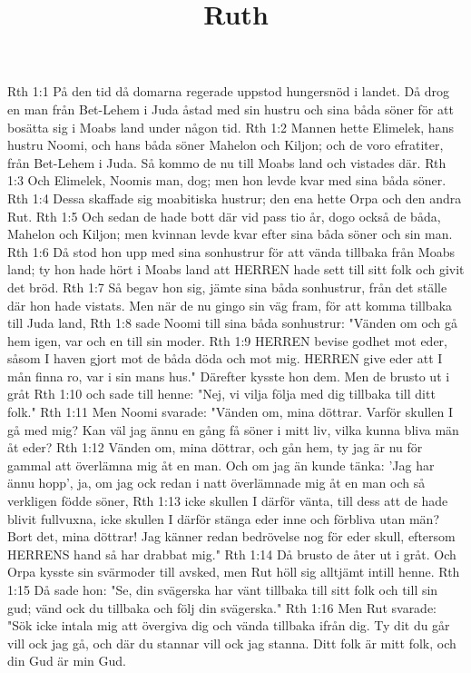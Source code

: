

\title{Ruth}

Rth 1:1  På den tid då domarna regerade uppstod hungersnöd i landet. Då drog en man från Bet-Lehem i Juda åstad med sin hustru och sina båda söner för att bosätta sig i Moabs land under någon tid.
Rth 1:2  Mannen hette Elimelek, hans hustru Noomi, och hans båda söner Mahelon och Kiljon; och de voro efratiter, från Bet-Lehem i Juda. Så kommo de nu till Moabs land och vistades där.
Rth 1:3  Och Elimelek, Noomis man, dog; men hon levde kvar med sina båda söner.
Rth 1:4  Dessa skaffade sig moabitiska hustrur; den ena hette Orpa och den andra Rut.
Rth 1:5  Och sedan de hade bott där vid pass tio år, dogo också de båda, Mahelon och Kiljon; men kvinnan levde kvar efter sina båda söner och sin man.
Rth 1:6  Då stod hon upp med sina sonhustrur för att vända tillbaka från Moabs land; ty hon hade hört i Moabs land att HERREN hade sett till sitt folk och givit det bröd.
Rth 1:7  Så begav hon sig, jämte sina båda sonhustrur, från det ställe där hon hade vistats. Men när de nu gingo sin väg fram, för att komma tillbaka till Juda land,
Rth 1:8  sade Noomi till sina båda sonhustrur: "Vänden om och gå hem igen, var och en till sin moder.
Rth 1:9  HERREN bevise godhet mot eder, såsom I haven gjort mot de båda döda och mot mig. HERREN give eder att I mån finna ro, var i sin mans hus." Därefter kysste hon dem. Men de brusto ut i gråt
Rth 1:10  och sade till henne: "Nej, vi vilja följa med dig tillbaka till ditt folk."
Rth 1:11  Men Noomi svarade: "Vänden om, mina döttrar. Varför skullen I gå med mig? Kan väl jag ännu en gång få söner i mitt liv, vilka kunna bliva män åt eder?
Rth 1:12  Vänden om, mina döttrar, och gån hem, ty jag är nu för gammal att överlämna mig åt en man. Och om jag än kunde tänka: 'Jag har ännu hopp', ja, om jag ock redan i natt överlämnade mig åt en man och så verkligen födde söner,
Rth 1:13  icke skullen I därför vänta, till dess att de hade blivit fullvuxna, icke skullen I därför stänga eder inne och förbliva utan män? Bort det, mina döttrar! Jag känner redan bedrövelse nog för eder skull, eftersom HERRENS hand så har drabbat mig."
Rth 1:14  Då brusto de åter ut i gråt. Och Orpa kysste sin svärmoder till avsked, men Rut höll sig alltjämt intill henne.
Rth 1:15  Då sade hon: "Se, din svägerska har vänt tillbaka till sitt folk och till sin gud; vänd ock du tillbaka och följ din svägerska."
Rth 1:16  Men Rut svarade: "Sök icke intala mig att övergiva dig och vända tillbaka ifrån dig. Ty dit du går vill ock jag gå, och där du stannar vill ock jag stanna. Ditt folk är mitt folk, och din Gud är min Gud.
